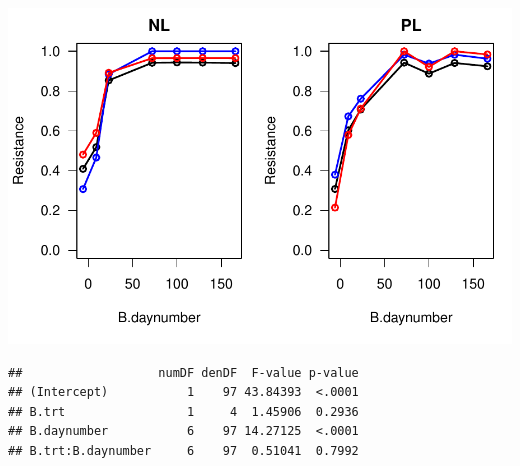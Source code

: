 \documentclass[]{article}
\begin{document}
\includegraphics{analysis_ecoevostoich_files/figure-latex/unnamed-chunk-30-1.pdf}

\begin{verbatim}
##                   numDF denDF  F-value p-value
## (Intercept)           1    97 43.84393  <.0001
## B.trt                 1     4  1.45906  0.2936
## B.daynumber           6    97 14.27125  <.0001
## B.trt:B.daynumber     6    97  0.51041  0.7992
\end{verbatim}
\end{document}
